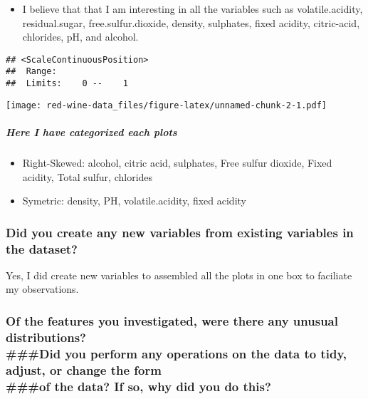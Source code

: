 \documentclass[]{article}
\providecommand{\tightlist}{%
  \setlength{\itemsep}{0pt}\setlength{\parskip}{0pt}}
\let\oldsubparagraph\subparagraph
\renewcommand{\subparagraph}[1]{\oldsubparagraph{#1}\mbox{}}
\begin{document}
\begin{itemize}
\tightlist
\item
  I believe that that I am interesting in all the variables such as
  volatile.acidity, residual.sugar, free.sulfur.dioxide, density,
  sulphates, fixed acidity, citric-acid, chlorides, pH, and alcohol.
\end{itemize}

\begin{verbatim}
## <ScaleContinuousPosition>
##  Range:  
##  Limits:    0 --    1
\end{verbatim}

\texttt{[image: red-wine-data\_files/figure-latex/unnamed-chunk-2-1.pdf]}

\subparagraph{Here I have categorized each
plots}\label{here-i-have-categorized-each-plots}

\begin{itemize}
\item
  Right-Skewed: alcohol, citric acid, sulphates, Free sulfur dioxide,
  Fixed acidity, Total sulfur, chlorides
\item
  Symetric: density, PH, volatile.acidity, fixed acidity
\end{itemize}

\subsubsection{Did you create any new variables from existing variables
in the
dataset?}\label{did-you-create-any-new-variables-from-existing-variables-in-the-dataset}

Yes, I did create new variables to assembled all the plots in one box to
faciliate my observations.

\subsubsection{\texorpdfstring{Of the features you investigated, were
there any unusual distributions?\\
\#\#\#Did you perform any operations on the data to tidy, adjust, or
change the form\\
\#\#\#of the data? If so, why did you do
this?}{Of the features you investigated, were there any unusual distributions? \#\#\#Did you perform any operations on the data to tidy, adjust, or change the form \#\#\#of the data? If so, why did you do this?}}\label{of-the-features-you-investigated-were-there-any-unusual-distributions-did-you-perform-any-operations-on-the-data-to-tidy-adjust-or-change-the-form-of-the-data-if-so-why-did-you-do-this}
\end{document}
